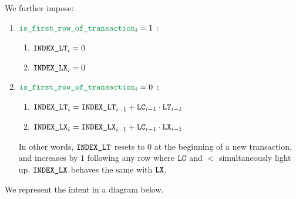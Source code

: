 \noindent We further impose:
\begin{enumerate}
    \item \If $\locIsFirstRowOfTransaction _{i} = 1$ \Then:
        \begin{enumerate}
            \item $\texttt{INDEX\_LT} _{i} = 0$
            \item $\texttt{INDEX\_LX} _{i} = 0$
        \end{enumerate}
    \item \If $\locIsFirstRowOfTransaction _{i} = 0$ \Then:
        \begin{enumerate}
            \item $\texttt{INDEX\_LT} _{i} = \texttt{INDEX\_LT} _{i - 1} + \texttt{LC} _{i - 1} \cdot \texttt{LT} _{i - 1}$
            \item $\texttt{INDEX\_LX} _{i} = \texttt{INDEX\_LX} _{i - 1} + \texttt{LC} _{i - 1} \cdot \texttt{LX} _{i - 1}$
        \end{enumerate}
        \saNote{}
        In other words, $\texttt{INDEX\_LT}$ resets to $0$ at the beginning of a new transaction,
        and increases by $1$ following any row where $\texttt{LC}$ and $\lt$ simultaneously light up.
        $\texttt{INDEX\_LX}$ behaves the same with $\texttt{LX}$.
\end{enumerate}
We represent the intent in a diagram below.


